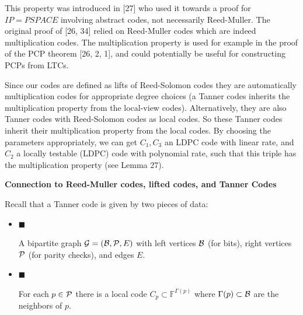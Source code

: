 \documentclass[10pt,a4paper]{article}
\begin{document}
This property was introduced in [27] who used it towards a proof for $IP=PSPACE$ involving abstract codes, not necessarily Reed-Muller. The original proof of [26, 34] relied on
Reed-Muller codes which are indeed multiplication codes. The multiplication property is used for example in the proof of the PCP theorem [26, 2, 1], and could potentially be useful for constructing PCPs from LTCs.\par




Since our codes are defined as lifts of Reed-Solomon codes they are automatically multiplication codes for appropriate degree choices (a Tanner codes inherits the multiplication property from the local-view codes). Alternatively, they are also
Tanner codes with Reed-Solomon codes as local codes. So these Tanner codes inherit their multiplication property from the local codes. By choosing the parameters appropriately, we can get $C_{1},C_{3}$ an LDPC code with linear rate, and $C_{2}$ a locally testable (LDPC) code with polynomial rate, such that this triple has the multiplication property (see Lemma 27).\par





\par\medskip\noindent\textbf{Connection to Reed-Muller codes, lifted codes, and Tanner Codes}\par




Recall that a Tanner code is given by two pieces of data:\par


\begin{itemize}


\item[] 
$\blacksquare$ 


A bipartite graph ${\cal G}=({\cal B},{\cal P},E)$ with left vertices ${\cal B}$ (for bits), right vertices ${\cal P}$ (for parity checks), and edges $E$.\par





\item[] 
$\blacksquare$ 


For each $p\in{\cal P}$ there is a local code $C_{p}\subset\mathbb{F}^{\Gamma(p)}$ where $\Gamma(p)\subset{\cal B}$ are the neighbors of $p$.\par





\end{itemize}
\end{document}

